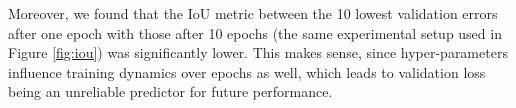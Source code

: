 Moreover, we found that the IoU metric between the 10 lowest validation errors after one epoch with those after 10 epochs (the same experimental setup used in Figure \ref{fig:iou}) was significantly lower. This makes sense, since hyper-parameters influence training dynamics over epochs as well, which leads to validation loss being an unreliable predictor for future performance.




